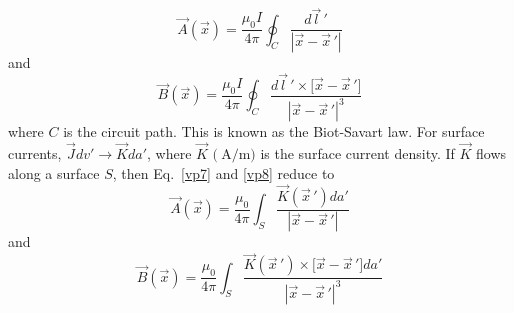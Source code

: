 \documentclass[11pt,a4paper,oneside]{book}
\numberwithin{equation}{section}
\newcommand{\abs}[1]{\left|#1\right|}
\theoremstyle{it}
\theoremstyle{definition}
\begin{document}
\begin{equation}\label{vp9}
	\vec{A}(\vec{x}) = \frac{\mu_0I}{4\pi}\oint_{C}\frac{d\vec{l}\,'}{\abs{\vec{x}-\vec{x}\,'}}
\end{equation}
and
\begin{equation}\label{vp10}
	\vec{B}(\vec{x}) = \frac{\mu_0I}{4\pi}\oint_{C}\frac{d\vec{l}\,'\times\big[\vec{x}-\vec{x}\,'\big]}{\abs{\vec{x}-\vec{x}\,'}^3}
\end{equation}
where $C$ is the circuit path. This is known as the Biot-Savart law. For surface currents, $\vec{J}dv'\rightarrow\vec{K}da'$, where $\vec{K}$ $\big(\SI{}{\ampere\per\meter}\big)$ is the surface current density. If $\vec{K}$ flows along a surface $S$, then Eq.~\eqref{vp7} and \ref{vp8} reduce to
\begin{equation}\label{vp11}
	\vec{A}(\vec{x}) = \frac{\mu_0}{4\pi}\int_{S}\frac{\vec{K}(\vec{x}\,')da'}{\abs{\vec{x}-\vec{x}\,'}}
\end{equation}
and
\begin{equation}\label{vp12}
	\vec{B}(\vec{x}) = \frac{\mu_0}{4\pi}\int_{S}\frac{\vec{K}(\vec{x}\,')\times\big[\vec{x}-\vec{x}\,'\big]da'}{\abs{\vec{x}-\vec{x}\,'}^3}
\end{equation}
\end{document}
